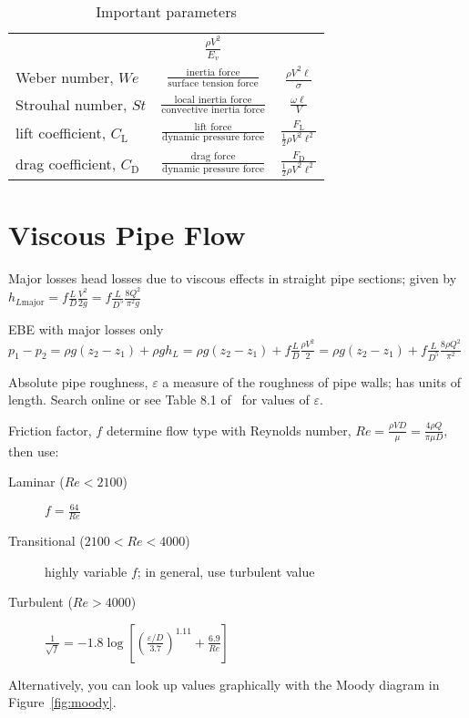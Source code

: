 \documentclass{article}
\begin{document}
\begin{table}
{\begin{tabu}{lcc}
  & \(\frac{\rho{}V^2}{E_v}\) \\
  Weber number, \(\mathit{We}\) & \(\frac{\textrm{inertia force}}{\textrm{surface tension force}}\)
  & \(\frac{\rho{}V^2\ell}{\sigma}\) \\
  Strouhal number, \(\mathit{St}\)
  & \(\frac{\textrm{local inertia force}}{\textrm{convective inertia force}}\)
  & \(\frac{\omega\ell}{V}\) \\
  lift coefficient, \(C_\mathrm{L}\) & \(\frac{\textrm{lift force}}{\textrm{dynamic pressure force}}\)
  & \(\frac{F_\mathrm{L}}{\frac12\rho{}V^2\ell^2}\) \\
  drag coefficient, \(C_\mathrm{D}\) & \(\frac{\textrm{drag force}}{\textrm{dynamic pressure force}}\)
  & \(\frac{F_\mathrm{D}}{\frac12\rho{}V^2\ell^2}\) \\
  \bottomrule
  \end{tabu}}
  \caption{Important parameters}\label{tab:params}
\end{table}

\section{Viscous Pipe Flow}

\begin{description*}
\item[Major losses] head losses due to viscous effects in straight pipe sections; given by
  \(h_{L\mathrm{major}} = f\frac{L}{D}\frac{V^2}{2g} = f\frac{L}{D^5}\frac{8Q^2}{\pi^2g}\)
\item[EBE with major losses only]
  \(p_1-p_2 = \rho{}g(z_2-z_1)+\rho{}gh_L = \rho{}g(z_2-z_1) + f\frac{L}{D}\frac{\rho{}V^2}{2}
  = \rho{}g(z_2-z_1) + f\frac{L}{D^5}\frac{8\rho{}Q^2}{\pi^2}\)
\item[Absolute pipe roughness, $\varepsilon$] a measure of the roughness of pipe walls; has units of
  length. Search online or see Table 8.1 of~\cite{fofm} for values of $\varepsilon$.
\item[Friction factor, $f$] determine flow type with Reynolds number,
  \(\mathit{Re} = \frac{\rho{}VD}{\mu} = \frac{4\rho{}Q}{\pi\mu{}D}\), then use:
  \begin{description}
  \item[Laminar (\(\mathit{Re}<2100\))]
    \(f = \frac{64}{\mathit{Re}}\)
  \item[Transitional (\(2100<\mathit{Re}<4000\))]
    highly variable $f$; in general, use turbulent value
  \item[Turbulent (\(\mathit{Re}>4000\))]
    \(\frac{1}{\sqrt{f}}
    = -1.8\log\left[{\left(\frac{\varepsilon/D}{3.7}\right)}^{1.11}
      + \frac{6.9}{\mathit{Re}}\right]\)
  \end{description}
  Alternatively, you can look up values graphically with the Moody diagram in Figure~\ref{fig:moody}.
\end{description*}
\end{document}
